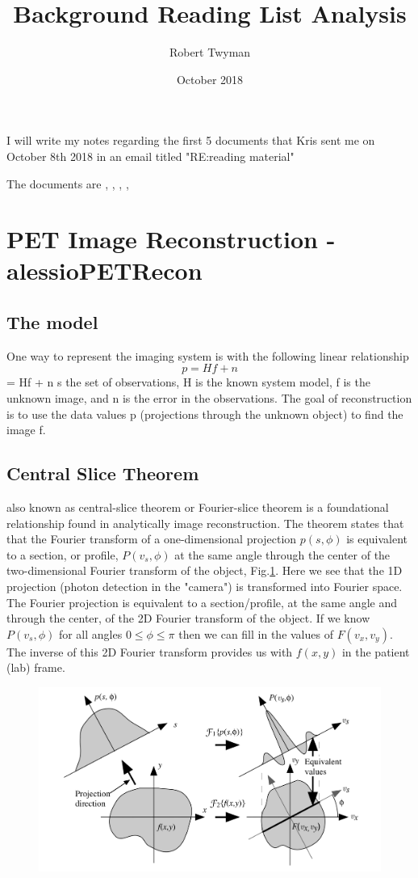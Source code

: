 \documentclass{article}
\title{Background Reading List Analysis}
\author{Robert Twyman}
\date{October 2018}
\begin{document}
I will write my notes regarding the first 5 documents that Kris sent me on October 8th 2018 in an email titled "RE:reading material"

The documents are \cite{Alessio2006}, \cite{Bailey2014}, \cite{Zeng2001}, \cite{vanderVos2017}, \cite{Qi2006}
\newpage

\tableofcontents

\newpage
\section{PET Image Reconstruction - 
alessioPETRecon} \cite{Alessio2006}
\subsection{The model}
One way to represent the imaging system is with the following linear relationship
\begin{equation}\label{eq.model}
p = Hf + n 
\end{equation} 
= Hf + n s the set of observations, H is the known system model, f is the unknown image, and n is the error in the observations. The goal of reconstruction is to use the data values p (projections through the unknown object) to find the image f.
\subsection{Central Slice Theorem}
also known as central-slice theorem or Fourier-slice theorem is a foundational relationship found in analytically image reconstruction. The theorem states that that the Fourier transform of a one-dimensional projection $p(s, \phi)$ is equivalent to a section, or profile, $P(v_s,\phi)$ at the same angle through the center of the two-dimensional Fourier transform of the object, Fig.\ref{Fig.Central-Slice}. Here we see that the 1D projection (photon detection in the "camera") is transformed into Fourier space. The Fourier projection is equivalent to a section/profile, at the same angle and through the center, of the 2D Fourier transform of the object. If we know $P(v_s,\phi)$ for all angles $0\leq \phi \leq \pi$ then we can fill in the values of $F(v_x,v_y)$. The inverse of this 2D Fourier transform provides us with $f(x,y)$ in the patient (lab) frame.

\begin{figure}
\centering
	\includegraphics[width=\linewidth]{Background Reading Analysis/Central-section_theorem.png}
    \caption{\label{Fig.Central-Slice}}
\end{figure}
\end{document}
